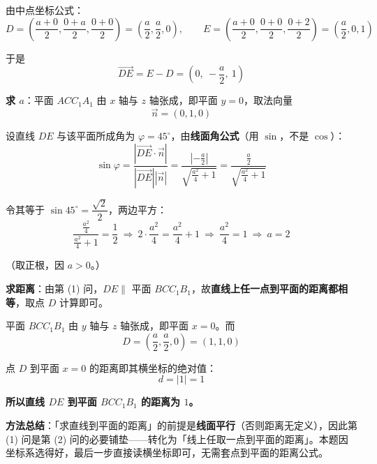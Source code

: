 \begin{answer}
由中点坐标公式：
\nopagebreak[4]
\[D=\left(\frac{a+0}{2},\frac{0+a}{2},\frac{0+0}{2}\right)=\left(\frac a2,\frac a2,0\right),\qquad E=\left(\frac{a+0}{2},\frac{0+0}{2},\frac{0+2}{2}\right)=\left(\frac a2,0,1\right)\]

于是
\nopagebreak[4]
\[\overrightarrow{DE}=E-D=\left(0,\ -\frac a2,\ 1\right)\]

\textbf{求 $a$}：平面 $ACC_1A_1$ 由 $x$ 轴与 $z$ 轴张成，即平面 $y=0$，取法向量
\nopagebreak[4]
\[\vec n=(0,1,0)\]

设直线 $DE$ 与该平面所成角为 $\varphi=45^\circ$，由\textbf{线面角公式}（用 $\sin$，不是 $\cos$）：
\nopagebreak[4]
\[\sin\varphi=\frac{\left|\overrightarrow{DE}\cdot\vec n\right|}{\left|\overrightarrow{DE}\right|\left|\vec n\right|}=\frac{\left|-\frac a2\right|}{\sqrt{\frac{a^2}{4}+1}}=\frac{\frac a2}{\sqrt{\frac{a^2}{4}+1}}\]

令其等于 $\sin45^\circ=\dfrac{\sqrt2}{2}$，两边平方：
\nopagebreak[4]
\[\frac{\frac{a^2}{4}}{\frac{a^2}{4}+1}=\frac12\ \Longrightarrow\ 2\cdot\frac{a^2}{4}=\frac{a^2}{4}+1\ \Longrightarrow\ \frac{a^2}{4}=1\ \Longrightarrow\ a=2\]

（取正根，因 $a>0$。）

\textbf{求距离}：由第 (1) 问，$DE\parallel$ 平面 $BCC_1B_1$，故\textbf{直线上任一点到平面的距离都相等}，取点 $D$ 计算即可。

平面 $BCC_1B_1$ 由 $y$ 轴与 $z$ 轴张成，即平面 $x=0$。而
\nopagebreak[4]
\[D=\left(\frac a2,\frac a2,0\right)=(1,1,0)\]

点 $D$ 到平面 $x=0$ 的距离即其横坐标的绝对值：
\nopagebreak[4]
\[d=|1|=1\]

\textbf{所以直线 $DE$ 到平面 $BCC_1B_1$ 的距离为 $1$。}

\begin{gktip}
\textbf{方法总结}：「求直线到平面的距离」的前提是\textbf{线面平行}（否则距离无定义），因此第 (1) 问是第 (2) 问的必要铺垫——转化为「线上任取一点到平面的距离」。本题因坐标系选得好，最后一步直接读横坐标即可，无需套点到平面的距离公式。
\end{gktip}



\par\medskip

\end{answer}
